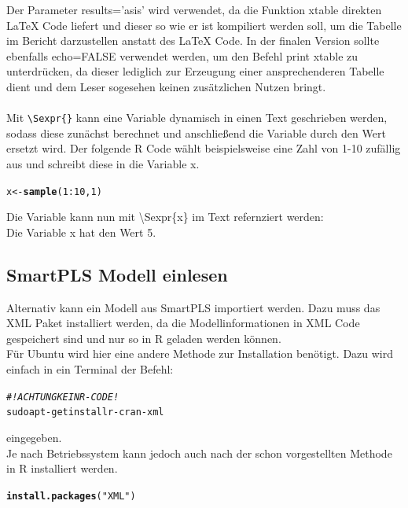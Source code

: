 \documentclass{article}\usepackage[]{graphicx}\usepackage[]{color}
\makeatletter
\newcommand{\hlnum}[1]{\textcolor[rgb]{0.686,0.059,0.569}{#1}}%
\newcommand{\hlstr}[1]{\textcolor[rgb]{0.192,0.494,0.8}{#1}}%
\newcommand{\hlcom}[1]{\textcolor[rgb]{0.678,0.584,0.686}{\textit{#1}}}%
\newcommand{\hlopt}[1]{\textcolor[rgb]{0,0,0}{#1}}%
\newcommand{\hlstd}[1]{\textcolor[rgb]{0.345,0.345,0.345}{#1}}%
\newcommand{\hlkwb}[1]{\textcolor[rgb]{0.69,0.353,0.396}{#1}}%
\newcommand{\hlkwd}[1]{\textcolor[rgb]{0.737,0.353,0.396}{\textbf{#1}}}%
\newenvironment{kframe}{%
 \def\at@end@of@kframe{}%
 \ifinner\ifhmode%
  \def\at@end@of@kframe{\end{minipage}}%
  \begin{minipage}{\columnwidth}%
 \fi\fi%
 \def\FrameCommand##1{\hskip\@totalleftmargin \hskip-\fboxsep
 \colorbox{shadecolor}{##1}\hskip-\fboxsep
     \hskip-\linewidth \hskip-\@totalleftmargin \hskip\columnwidth}%
 \MakeFramed {\advance\hsize-\width
   \@totalleftmargin\z@ \linewidth\hsize
   \@setminipage}}%
 {\par\unskip\endMakeFramed%
 \at@end@of@kframe}
\newenvironment{knitrout}{}{} %
\makeatother
\begin{document}
Der Parameter results='asis' wird verwendet, da die Funktion xtable direkten LaTeX Code liefert und dieser so wie er ist kompiliert werden soll, um die Tabelle im Bericht darzustellen anstatt des LaTeX Code. In der finalen Version sollte ebenfalls echo=FALSE verwendet werden, um den Befehl print xtable zu unterdrücken, da dieser lediglich zur Erzeugung einer ansprechenderen Tabelle dient und dem Leser sogesehen keinen zusätzlichen Nutzen bringt.\\
\\
Mit \verb!\Sexpr{}! kann eine Variable dynamisch in einen Text geschrieben werden, sodass diese zunächst berechnet und anschließend die Variable durch den Wert ersetzt wird. Der folgende R Code wählt beispielsweise eine Zahl von 1-10 zufällig aus und schreibt diese in die Variable x.
\begin{knitrout}
\color{fgcolor}\begin{kframe}
\begin{alltt}
\hlstd{x} \hlkwb{<-} \hlkwd{sample}\hlstd{(}\hlnum{1}\hlopt{:}\hlnum{10}\hlstd{,} \hlnum{1}\hlstd{)}
\end{alltt}
\end{kframe}
\end{knitrout}
Die Variable kann nun mit \textbackslash{}Sexpr\{x\} im Text refernziert werden:\\
Die Variable x hat den Wert 5.\\

\subsection{SmartPLS Modell einlesen}

Alternativ kann ein Modell aus SmartPLS importiert werden. Dazu muss das XML Paket installiert werden, da die Modellinformationen in XML Code gespeichert sind und nur so in R geladen werden können.\\
Für Ubuntu wird hier eine andere Methode zur Installation benötigt. Dazu wird einfach in ein Terminal der Befehl:
\begin{knitrout}
\color{fgcolor}\begin{kframe}
\begin{alltt}
\hlcom{#!ACHTUNG KEIN R-CODE!}
sudo apt-get install r-cran-xml
\end{alltt}
\end{kframe}
\end{knitrout}
eingegeben.\\
Je nach Betriebssystem kann jedoch auch nach der schon vorgestellten Methode in R installiert werden.
\begin{knitrout}
\color{fgcolor}\begin{kframe}
\begin{alltt}
\hlkwd{install.packages}\hlstd{(}\hlstr{"XML"}\hlstd{)}
\end{alltt}
\end{kframe}
\end{knitrout}
\end{document}
